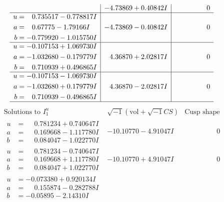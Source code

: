 \documentclass[1p]{elsarticle_modified}
\theoremstyle{definition}
\newcommand{\I}{\sqrt{-1}}
\begin{document}
$$\begin{array}{c|c|c}
 & -4.73869 + 0.40842 I & \phantom{-0.000000 } 0 \\ \hline\begin{aligned}
u &= \phantom{-}0.735517 - 0.778817 I \\
a &= \phantom{-}0.67775 - 1.79166 I \\
b &= -0.779920 - 1.015750 I\end{aligned}
 & -4.73869 - 0.40842 I & \phantom{-0.000000 } 0 \\ \hline\begin{aligned}
u &= -0.107153 + 1.069730 I \\
a &= -1.032680 - 0.179779 I \\
b &= \phantom{-}0.710939 + 0.496865 I\end{aligned}
 & \phantom{-}4.36870 + 2.02817 I & \phantom{-0.000000 } 0 \\ \hline\begin{aligned}
u &= -0.107153 - 1.069730 I \\
a &= -1.032680 + 0.179779 I \\
b &= \phantom{-}0.710939 - 0.496865 I\end{aligned}
 & \phantom{-}4.36870 - 2.02817 I & \phantom{-0.000000 } 0\\
 \hline 
 \end{array}$$\newpage$$\begin{array}{c|c|c}  
\text{Solutions to }I^u_{1}& \I (\text{vol} + \sqrt{-1}CS) & \text{Cusp shape}\\
 \hline 
\begin{aligned}
u &= \phantom{-}0.781234 + 0.740647 I \\
a &= \phantom{-}0.169668 - 1.117780 I \\
b &= \phantom{-}0.084047 - 1.022770 I\end{aligned}
 & -10.10770 - 4.91047 I & \phantom{-0.000000 } 0 \\ \hline\begin{aligned}
u &= \phantom{-}0.781234 - 0.740647 I \\
a &= \phantom{-}0.169668 + 1.117780 I \\
b &= \phantom{-}0.084047 + 1.022770 I\end{aligned}
 & -10.10770 + 4.91047 I & \phantom{-0.000000 } 0 \\ \hline\begin{aligned}
u &= -0.073380 + 0.920134 I \\
a &= \phantom{-}0.155874 - 0.282788 I \\
b &= -0.05895 - 2.14310 I\end{aligned}

\end{array}$$
\end{document}
